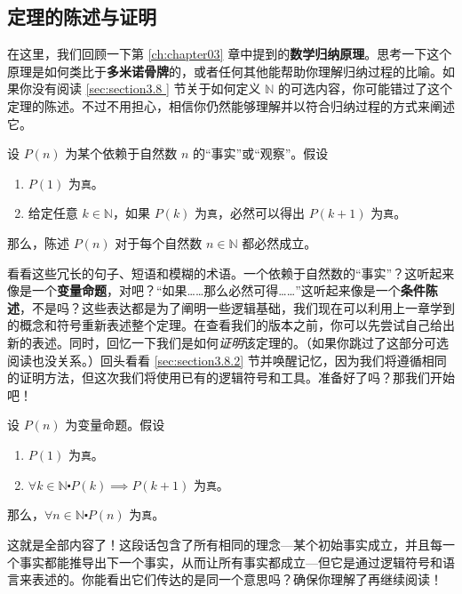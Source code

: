 \subsection{定理的陈述与证明}

在这里，我们回顾一下第 \ref{ch:chapter03} 章中提到的\textbf{数学归纳原理}。思考一下这个原理是如何类比于\textbf{多米诺骨牌}的，或者任何其他能帮助你理解归纳过程的比喻。如果你没有阅读 \ref{sec:section3.8 } 节关于如何定义 $\mathbb{N}$ 的可选内容，你可能错过了这个定理的陈述。不过不用担心，相信你仍然能够理解并以符合归纳过程的方式来阐述它。

\begin{theorem}[数学归纳原理]
    设 $P(n)$ 为某个依赖于自然数 $n$ 的``事实''或``观察''。假设
    \begin{enumerate}
        \item $P(1)$ 为\verb|真|。
        \item 给定任意 $k \in \mathbb{N}$，如果 $P(k)$ 为\verb|真|，必然可以得出 $P(k+1)$ 为\verb|真|。
    \end{enumerate}
    那么，陈述 $P(n)$ 对于每个自然数 $n \in \mathbb{N}$ 都必然成立。
\end{theorem}

看看这些冗长的句子、短语和模糊的术语。一个依赖于自然数的``事实''？这听起来像是一个\textbf{变量命题}，对吧？``如果……那么必然可得……''这听起来像是一个\textbf{条件陈述}，不是吗？这些表达都是为了阐明一些逻辑基础，我们现在可以利用上一章学到的概念和符号重新表述整个定理。在查看我们的版本之前，你可以先尝试自己给出新的表述。同时，回忆一下我们是如何\emph{证明}该定理的。（如果你跳过了这部分可选阅读也没关系。）回头看看 \ref{sec:section3.8.2} 节并唤醒记忆，因为我们将遵循相同的证明方法，但这次我们将使用已有的逻辑符号和工具。准备好了吗？那我们开始吧！

\begin{theorem}[数学归纳原理]\label{theorem5.2.2}
    设 $P(n)$ 为变量命题。假设
    \begin{enumerate}[label=(\arabic*)]
        \item $P(1)$ 为\verb|真|。
        \item $\forall k \in \mathbb{N} \centerdot P(k) \implies P(k+1)$ 为\verb|真|。
    \end{enumerate}
    那么，$\forall n \in \mathbb{N} \centerdot P(n)$ 为\verb|真|。
\end{theorem}

这就是全部内容了！这段话包含了所有相同的理念---某个初始事实成立，并且每一个事实都能推导出下一个事实，从而让所有事实都成立---但它是通过逻辑符号和语言来表述的。你能看出它们传达的是同一个意思吗？确保你理解了再继续阅读！

